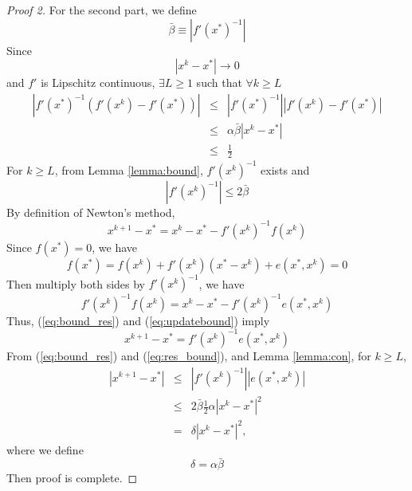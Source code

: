 \begin{proof}[Proof 2]
    For the second part, we define \[
        \bar{\beta} \equiv |f'(x^*)^{-1}|
    \]
    Since \[
        |x^{k} - x^*| \to 0
    \]
    and $f'$ is Lipschitz continuous, $\exists L \ge 1$ such that $\forall k \ge L$ 
    \begin{eqnarray*}
    |f'(x^*)^{-1} (f'(x^k)-f'(x^*))|
    & \leq &   
    |f'(x^*)^{-1}| |f'(x^k)-f'(x^*)| \\
    & \leq & \alpha \bar{\beta} |x^k - x^*|\\
    & \leq & \frac{1}{2}
    \end{eqnarray*}
    For $k \ge L$, from Lemma \ref{lemma:bound}, $f'(x^k)^{-1}$ exists and \begin{equation}
        |f'(x^k)^{-1}| \leq 2 \bar{\beta} \label{eq:bound_res}
    \end{equation}
    By definition of Newton's method, \begin{equation}
        x^{k+1} - x^* = x^k - x^* - f'(x^k)^{-1} f(x^k) \label{eq:updatebound}
    \end{equation}
    Since $f(x^*) = 0$, we have \[
        f(x^*) = f(x^k) + f'(x^k)(x^* - x^k) + e(x^*, x^k) = 0
    \]
    Then multiply both sides by $f'(x^k)^{-1}$, we have \begin{equation}
        f'(x^k)^{-1} f(x^k) = x^k - x^* - f'(x^k)^{-1} e(x^*, x^k) \label{eq:res_bound} 
    \end{equation}
    Thus, (\ref{eq:bound_res}) and (\ref{eq:updatebound}) imply \begin{equation}
        x^{k+1} - x^* = f'(x^k)^{-1} e(x^*, x^k) \label{eq:final_bound}
    \end{equation}
    From (\ref{eq:bound_res}) and (\ref{eq:res_bound}), and Lemma \ref{lemma:con}, for $k \ge L$, 
    \begin{eqnarray*}
        |x^{k+1} - x^*| & \leq & 
        |f'(x^k)^{-1}|
        |e(x^*,x^k)|\\
        & \leq & 2\bar{\beta}\frac{1}{2}
        \alpha 
        |x^{k} - x^*|^2  \\
        & = & \delta
        |x^{k} - x^*|^2,  
    \end{eqnarray*}
    where we define \[
        \delta = \alpha \bar{\beta}
    \]
    Then proof is complete.
\end{proof}

